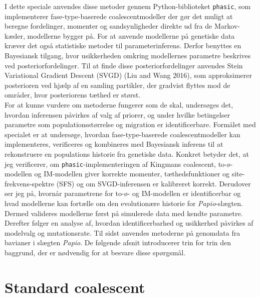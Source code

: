 \documentclass[
  10pt,
  a4paper,
]{scrbook}
\let\oldemph\emph
\renewcommand\emph[1]{\oldemph{\color{gray}#1}}
\begin{document}
I dette speciale anvendes disse metoder gennem Python-biblioteket
\texttt{phasic}, som implementerer fase-type-baserede coalescentmodeller
der gør det muligt at beregne fordelinger, momenter og sandsynligheder
direkte ud fra de Markov-kæder, modellerne bygger på. For at anvende
modellerne på genetiske data kræver det også statistiske metoder til
parameterinferens. Derfor benyttes en Bayesiansk tilgang, hvor
usikkerheden omkring modellernes parametre beskrives ved
posteriorfordelinger. Til at finde disse posteriorfordelinger anvendes
Stein Variational Gradient Descent (SVGD) (Liu and Wang 2016), som
approksimerer posterioren ved hjælp af en samling partikler, der
gradvist flyttes mod de områder, hvor posteriorens tæthed er størst.\\
For at kunne vurdere om metoderne fungerer som de skal, undersøges det,
hvordan inferensen påvirkes af valg af priorer, og under hvilke
betingelser parametre som populationsstørrelse og migration er
identificerbare. Formålet med specialet er at undersøge, hvordan
fase-type-baserede coalescentmodeller kan implementeres, verificeres og
kombineres med Bayesiansk inferens til at rekonstruere en populations
historie fra genetiske data. Konkret betyder det, at jeg verificerer, om
\texttt{phasic}-implementeringen af Kingmans coalescent, to-ø-modellen
og IM-modellen giver korrekte momenter, tæthedsfunktioner og
site-frekvens-spektre (SFS) og om SVGD-inferensen er kalibreret korrekt.
Derudover ser jeg på, hvornår parametrene for to-ø- og IM-modellen er
identificerbar og hvad modellerne kan fortælle om den evolutionære
historie for \emph{Papio}-slægten. Dermed valideres modellerne først på
simulerede data med kendte parametre. Derefter følger en analyse af,
hvordan identificerbarhed og usikkerhed påvirkes af modelvalg og
mutationsrate. Til sidst anvendes metoderne på genomdata fra bavianer i
slægten \emph{Papio}. De følgende afsnit introducerer trin for trin den
baggrund, der er nødvendig for at besvare disse spørgsmål.

\section{Standard coalescent}\label{standard-coalescent}
\end{document}

